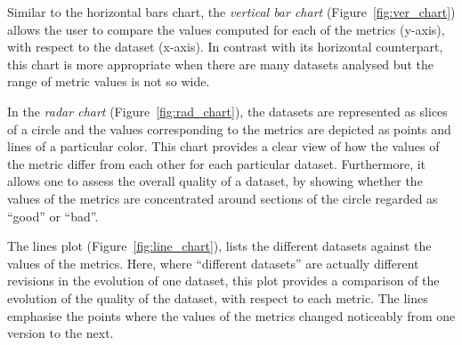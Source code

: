 Similar to the horizontal bars chart, the \emph{vertical bar chart} (Figure~\ref{fig:ver_chart}) allows the user to compare the values computed for each of the metrics (y-axis), with respect to the dataset (x-axis).
In contrast with its horizontal counterpart, this chart is more appropriate when there are many datasets analysed but the range of metric values is not so wide.

In the \emph{radar chart} (Figure~\ref{fig:rad_chart}), the datasets are represented as slices of a circle and the values corresponding to the metrics are depicted as points and lines of a particular color.
This chart provides a clear view of how the values of the metric differ from each other for each particular dataset. 
Furthermore, it allows one to assess the overall quality of a dataset, by showing whether the values of the metrics are concentrated around sections of the circle regarded as “good” or “bad”.

The lines plot (Figure~\ref{fig:line_chart}), lists the different datasets against the values of the metrics.
Here, where “different datasets” are actually different revisions in the evolution of one dataset, this plot provides a comparison of the evolution of the quality of the dataset, with respect to each metric.
The lines emphasise the points where the values of the metrics changed noticeably from one version to the next.


